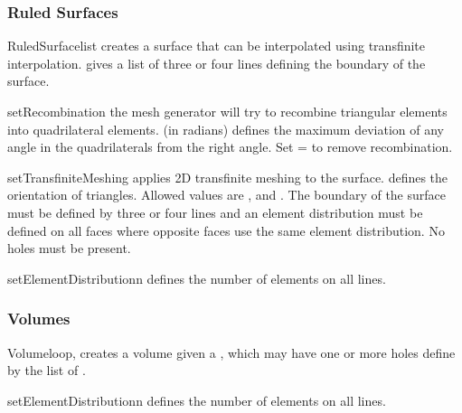 \subsubsection{Ruled Surfaces}
\begin{classdesc}{RuledSurface}{list}
creates a surface that can be interpolated using transfinite interpolation.
 gives a list of three or four lines defining the boundary of the
surface.
\end{classdesc}

\begin{methoddesc}[RuledSurface]{setRecombination}{}
the mesh generator will try to recombine triangular elements into
quadrilateral elements.  (in radians) defines the
maximum deviation of any angle in the quadrilaterals from the right angle.
Set = to remove recombination.
\end{methoddesc}

\begin{methoddesc}[RuledSurface]{setTransfiniteMeshing}{}
applies 2D transfinite meshing to the surface.
 defines the orientation of triangles. Allowed values
are ,  and .
The boundary of the surface must be defined by three or four lines and an
element distribution must be defined on all faces where opposite
faces use the same element distribution. No holes must be present.
\end{methoddesc}

\begin{methoddesc}[RuledSurface]{setElementDistribution}{n}
defines the number of elements on all lines.
\end{methoddesc}

\subsubsection{Volumes}
\begin{classdesc}{Volume}{loop, }
creates a volume given a , which may have one or more holes
define by the list of .
\end{classdesc}

\begin{methoddesc}[Volume]{setElementDistribution}{n}
defines the number of elements on all lines.
\end{methoddesc}

